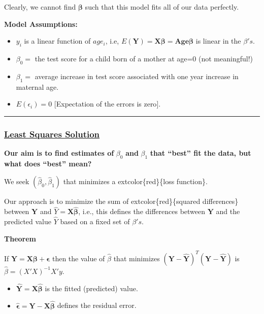 \documentclass[
  letterpaper,
  DIV=11,
  numbers=noendperiod]{scrreprt}
\begin{document}
Clearly, we cannot find \(\mathbf{\beta}\) such that this model fits all
of our data perfectly.

\textbf{Model Assumptions:}

\begin{itemize}
\item
  \(y_i\) is a linear function of \(age_i\), i.e,
  \(E(\mathbf{Y}) = \mathbf{X\beta} = \mathbf{Age\beta}\) is linear in
  the \(\beta's\).
\item
  \(\beta_0=\) the test score for a child born of a mother at age=0 (not
  meaningful!)
\item
  \(\beta_1=\) average increase in test score associated with one year
  increase in maternal age.
\item
  \(E(\epsilon_i) = 0\) {[}Expectation of the errors is zero{]}.
\end{itemize}

\begin{center}\rule{0.5\linewidth}{0.5pt}\end{center}

\hypertarget{least-squares-solution}{%
\subsubsection*{\texorpdfstring{\ul{Least Squares
Solution}}{Least Squares Solution}}\label{least-squares-solution}}

\textbf{Our aim is to find estimates of} \(\beta_0\) \textbf{and}
\(\beta_1\) \textbf{that ``best'' fit the data, but what does ``best''
mean?}

We seek \((\hat{\beta}_0, \hat{\beta}_1)\) that minimizes a
extcolor\{red\}\{loss function\}.

Our approach is to minimize the sum of extcolor\{red\}\{squared
differences\} between \(\mathbf{Y}\) and
\(\hat{Y} = \mathbf{X\hat{\beta}}\), i.e., this defines the differences
between \(\mathbf{Y}\) and the predicted value \(\hat{Y}\) based on a
fixed set of \(\beta's\).

\begin{tcolorbox}[enhanced jigsaw, rightrule=.15mm, breakable, left=2mm, colframe=quarto-callout-note-color-frame, opacityback=0, leftrule=.75mm, toprule=.15mm, colback=white, arc=.35mm, bottomrule=.15mm]

\textbf{Theorem}\vspace{2mm}

If \(\mathbf{Y} = \mathbf{X\beta} + \mathbf{\epsilon}\) then the value
of \(\hat{\beta}\) that minimizes
\((\mathbf{Y - \hat{Y}})^T(\mathbf{Y - \hat{Y}})\) is
\(\hat{\beta} = (X'X)^{-1} X'y\).

\begin{itemize}
\item
  \(\mathbf{\hat{Y}} = \mathbf{X \hat{\beta}}\) is the fitted
  (predicted) value.
\item
  \(\mathbf{\hat{\epsilon}} = \mathbf{Y} - \mathbf{X\hat{\beta}}\)
  defines the residual error.
\end{itemize}

\end{tcolorbox}
\end{document}
